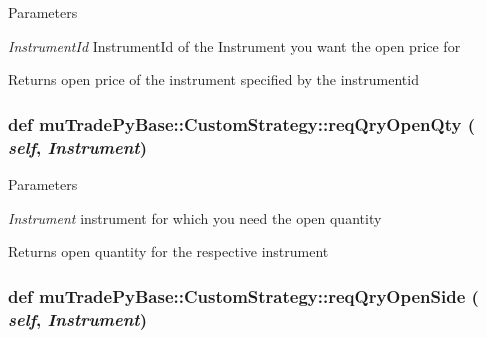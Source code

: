 \begin{DoxyParams}{Parameters}
\item[{\em InstrumentId}]InstrumentId of the Instrument you want the open price for \end{DoxyParams}
\begin{DoxyReturn}{Returns}
open price of the instrument specified by the instrumentid 
\end{DoxyReturn}
\hypertarget{classmuTradePyBase_1_1CustomStrategy_a44a5e9d557e3de1f6cc1ba7f1b192e40}{
\subsubsection[{reqQryOpenQty}]{\setlength{\rightskip}{0pt plus 5cm}def muTradePyBase::CustomStrategy::reqQryOpenQty ( {\em self}, \/   {\em Instrument})}}
\label{classmuTradePyBase_1_1CustomStrategy_a44a5e9d557e3de1f6cc1ba7f1b192e40}

\begin{DoxyParams}{Parameters}
\item[{\em Instrument}]instrument for which you need the open quantity \end{DoxyParams}
\begin{DoxyReturn}{Returns}
open quantity for the respective instrument 
\end{DoxyReturn}
\hypertarget{classmuTradePyBase_1_1CustomStrategy_afa2494957cf0c4cc62ae833c6f293654}{
\subsubsection[{reqQryOpenSide}]{\setlength{\rightskip}{0pt plus 5cm}def muTradePyBase::CustomStrategy::reqQryOpenSide ( {\em self}, \/   {\em Instrument})}}
\label{classmuTradePyBase_1_1CustomStrategy_afa2494957cf0c4cc62ae833c6f293654}

